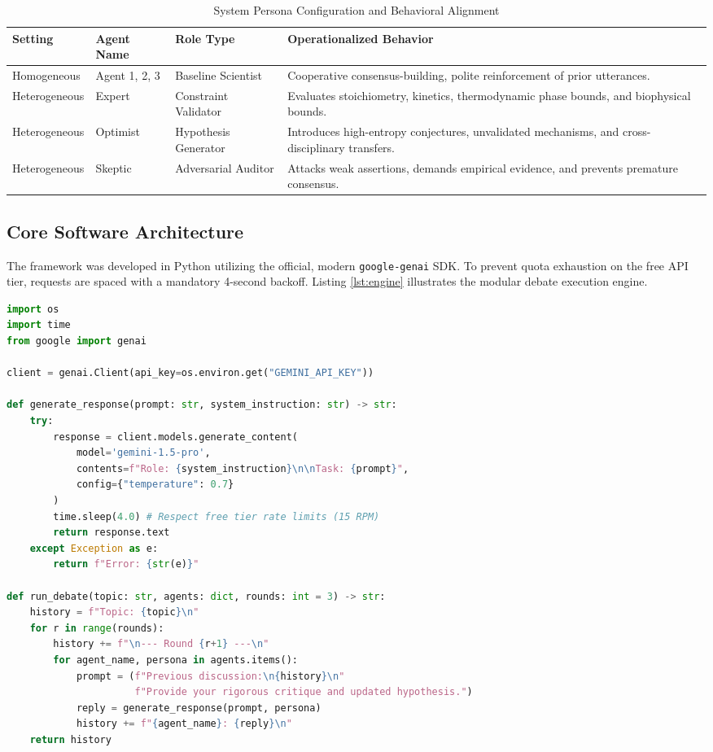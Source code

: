 \documentclass[conference,onecolumn]{IEEEtran}
\begin{document}
\begin{table}[htbp]
\caption{System Persona Configuration and Behavioral Alignment}
\label{tab:personas}
\centering
\begin{tabular}{lllp{6.5cm}}
\toprule
\textbf{Setting} & \textbf{Agent Name} & \textbf{Role Type} & \textbf{Operationalized Behavior} \\
\midrule
Homogeneous & Agent 1, 2, 3 & Baseline Scientist & Cooperative consensus-building, polite reinforcement of prior utterances. \\
\midrule
Heterogeneous & Expert & Constraint Validator & Evaluates stoichiometry, kinetics, thermodynamic phase bounds, and biophysical bounds. \\
Heterogeneous & Optimist & Hypothesis Generator & Introduces high-entropy conjectures, unvalidated mechanisms, and cross-disciplinary transfers. \\
Heterogeneous & Skeptic & Adversarial Auditor & Attacks weak assertions, demands empirical evidence, and prevents premature consensus. \\
\bottomrule
\end{tabular}
\end{table}

\subsection{Core Software Architecture}
The framework was developed in Python utilizing the official, modern \texttt{google-genai} SDK. To prevent quota exhaustion on the free API tier, requests are spaced with a mandatory 4-second backoff. Listing \ref{lst:engine} illustrates the modular debate execution engine.

\begin{lstlisting}[language=Python, caption={Core multi-agent debate coordination script (\texttt{src/debate\_engine.py}).}, label={lst:engine}]
import os
import time
from google import genai

client = genai.Client(api_key=os.environ.get("GEMINI_API_KEY"))

def generate_response(prompt: str, system_instruction: str) -> str:
    try:
        response = client.models.generate_content(
            model='gemini-1.5-pro',
            contents=f"Role: {system_instruction}\n\nTask: {prompt}",
            config={"temperature": 0.7}
        )
        time.sleep(4.0) # Respect free tier rate limits (15 RPM)
        return response.text
    except Exception as e:
        return f"Error: {str(e)}"

def run_debate(topic: str, agents: dict, rounds: int = 3) -> str:
    history = f"Topic: {topic}\n"
    for r in range(rounds):
        history += f"\n--- Round {r+1} ---\n"
        for agent_name, persona in agents.items():
            prompt = (f"Previous discussion:\n{history}\n"
                      f"Provide your rigorous critique and updated hypothesis.")
            reply = generate_response(prompt, persona)
            history += f"{agent_name}: {reply}\n"
    return history
\end{lstlisting}
\end{document}

